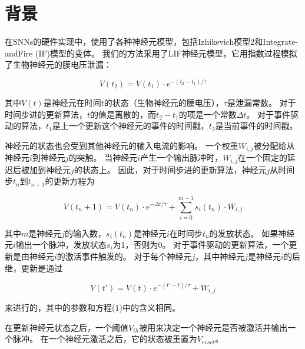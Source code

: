 \chapter{背景}

在SNNs的硬件实现中，使用了各种神经元模型，包括Izhikevich模型2和Integrate-andFire (IF)模型的变体。
我们的方法采用了LIF神经元模型，它用指数过程模拟了生物神经元的膜电压泄漏：

$$
V(t_2) = V(t_1) \cdot e^{-(t_2-t_1)/\tau}
$$

其中$V(t)$是神经元在时间$t$的状态（生物神经元的膜电压），$\tau$是泄漏常数。
对于时间步进的更新算法，$t$的值是离散的，而$t_2-t_1$的项是一个常数$\Delta t$。
对于事件驱动的算法，$t_1$是上一个更新这个神经元的事件的时间戳，$t_2$是当前事件的时间戳。

神经元的状态也会受到其他神经元的输入电流的影响。
一个权重$W_{i,j}$被分配给从神经元$i$到神经元$j$的突触。
当神经元$i$产生一个输出脉冲时，$W_{i,j}$在一个固定的延迟后被加到神经元$j$的状态上。
因此，对于时间步进的更新算法，神经元$j$从时间步$t_n$到$t_{n+1}$的更新方程为

$$
V(t_n+1) = V(t_n) \cdot e^{-\Delta t/\tau} + \sum_{i=0}^{m-1} s_i(t_n) \cdot W_{i,j}
$$

其中$m$是神经元$j$的输入数，$s_i(t_n)$是神经元$i$在时间步$t_n$的发放状态。
如果神经元$i$输出一个脉冲，发放状态$s_i$为1，否则为0。
对于事件驱动的更新算法，一个更新是由神经元$i$的激活事件触发的。
对于每个神经元$j$，其中神经元$j$是神经元$i$的后继，更新是通过

$$
V(t') = V(t) \cdot e^{-(t'-t)/\tau} + W_{i,j}
$$

来进行的，其中的参数和方程(1)中的含义相同。

在更新神经元状态之后，一个阈值$V_{th}$被用来决定一个神经元是否被激活并输出一个脉冲。
在一个神经元激活之后，它的状态被重置为$V_{reset}$。
